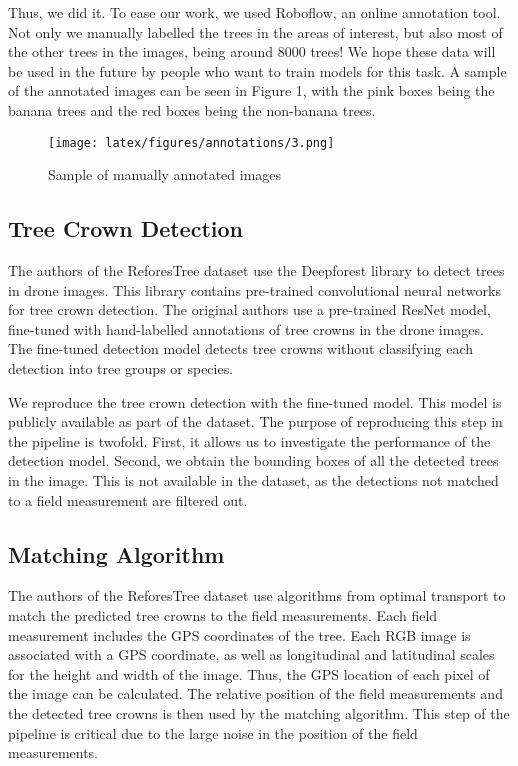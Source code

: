 \documentclass[10pt,twocolumn,letterpaper]{article}
\begin{document}
Thus, we did it. To ease our work, we used Roboflow, an online annotation tool. Not only we manually labelled the trees in the areas of interest, but also most of the other trees in the images, being around 8000 trees! We hope these data will be used in the future by people who want to train models for this task. A sample of the annotated images can be seen in Figure 1, with the pink boxes being the banana trees and the red boxes being the non-banana trees.

\begin{figure}
\centering
\texttt{[image: latex/figures/annotations/3.png]}  
\caption{Sample of manually annotated images}
\label{annotations}
\end{figure}

\subsection{Tree Crown Detection}
The authors of the ReforesTree dataset use the Deepforest library \cite{weinstein2020deepforest} to detect trees in drone images.
This library contains pre-trained convolutional neural networks for tree crown detection.
The original authors use a pre-trained ResNet model, fine-tuned with hand-labelled annotations of tree crowns in the drone images.
The fine-tuned detection model detects tree crowns without classifying each detection into tree groups or species.

We reproduce the tree crown detection with the fine-tuned model.
This model is publicly available as part of the dataset.
The purpose of reproducing this step in the pipeline is twofold.
First, it allows us to investigate the performance of the detection model.
Second, we obtain the bounding boxes of all the detected trees in the image.
This is not available in the dataset, as the detections not matched to a field measurement are filtered out.

\subsection{Matching Algorithm}
The authors of the ReforesTree dataset use algorithms from optimal transport to match the predicted tree crowns to the field measurements. 
Each field measurement includes the GPS coordinates of the tree.
Each RGB image is associated with a GPS coordinate, as well as longitudinal and latitudinal scales for the height and width of the image.
Thus, the GPS location of each pixel of the image can be calculated.
The relative position of the field measurements and the detected tree crowns is then used by the matching algorithm.
This step of the pipeline is critical due to the large noise in the position of the field measurements.
\end{document}
